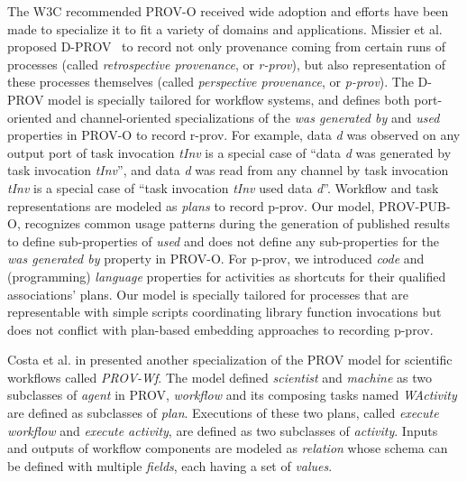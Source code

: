 The W3C recommended PROV-O received wide adoption and efforts have been made to specialize it to fit a variety of domains and applications. Missier et al. proposed D-PROV~\cite{missier2013d} to record not only provenance coming from certain runs of processes (called \emph{retrospective provenance}, or \emph{r-prov}), but also representation of these processes themselves (called \emph{perspective provenance}, or \emph{p-prov}). The D-PROV model is specially tailored for workflow systems, and defines both port-oriented and channel-oriented specializations of the \emph{was generated by} and \emph{used} properties in PROV-O to record r-prov. For example, data \emph{d} was observed on any output port of task invocation \emph{tInv} is a special case of ``data \emph{d} was generated by task invocation \emph{tInv}'',  and data \emph{d} was read from any channel by task invocation \emph{tInv} is a special case of ``task invocation \emph{tInv} used data \emph{d}''. Workflow and task representations are modeled as \emph{plans} to record p-prov. Our model, PROV-PUB-O, recognizes common usage patterns during the generation of published results to define sub-properties of \emph{used} and does not define any sub-properties for the \emph{was generated by} property in PROV-O. For p-prov, we introduced \emph{code} and (programming) \emph{language} properties for activities as shortcuts for their qualified associations' plans. Our model is specially tailored for processes that are representable with simple scripts coordinating library function invocations but does not conflict with plan-based embedding approaches to recording p-prov.

Costa et al. in \cite{costa2013capturing} presented another specialization of the PROV model for scientific workflows called \emph{PROV-Wf}. The model defined \emph{scientist} and \emph{machine} as two subclasses of \emph{agent} in PROV, \emph{workflow} and its composing tasks named \emph{WActivity} are defined as subclasses of \emph{plan}. Executions of these two plans, called \emph{execute workflow} and \emph{execute activity}, are defined as two subclasses of \emph{activity}. Inputs and outputs of workflow components are modeled as \emph{relation} whose schema can be defined with multiple \emph{fields}, each having a set of \emph{values}.

